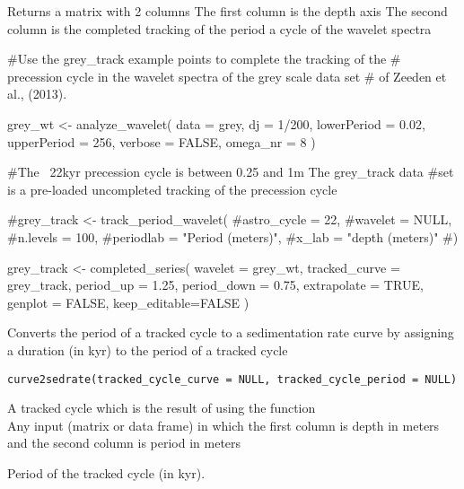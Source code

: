 \documentclass[a4paper]{book}
\begin{document}
%
\begin{Value}
Returns a matrix with 2 columns
The first column is the depth axis
The second column is the completed tracking of the period a cycle of the wavelet spectra
\end{Value}
%
\begin{Examples}
\begin{ExampleCode}

#Use the grey_track example points to complete the tracking of the
# precession cycle in the wavelet spectra of the grey scale data set
# of Zeeden et al., (2013).



grey_wt <-
 analyze_wavelet(
   data = grey,
   dj = 1/200,
   lowerPeriod = 0.02,
   upperPeriod = 256,
   verbose = FALSE,
   omega_nr = 8
 )

#The ~22kyr precession cycle is between 0.25 and 1m The grey_track data
#set is a pre-loaded uncompleted tracking of the precession cycle

#grey_track <- track_period_wavelet(
#astro_cycle = 22,
#wavelet = NULL,
#n.levels = 100,
#periodlab = "Period (meters)",
#x_lab = "depth (meters)"
#)



grey_track <- completed_series(
 wavelet = grey_wt,
 tracked_curve  = grey_track,
 period_up  = 1.25,
 period_down  = 0.75,
 extrapolate = TRUE,
genplot = FALSE,
keep_editable=FALSE
)


\end{ExampleCode}
\end{Examples}
%
\begin{Description}
Converts the period of a tracked cycle to a sedimentation rate curve by
assigning a duration (in kyr) to the period of a tracked cycle
\end{Description}
%
\begin{Usage}
\begin{verbatim}
curve2sedrate(tracked_cycle_curve = NULL, tracked_cycle_period = NULL)
\end{verbatim}
\end{Usage}
%
\begin{Arguments}
\begin{ldescription}
\item[\code{tracked\_cycle\_curve}] A tracked cycle  which is the result of using the  function \\{}
Any input (matrix or data frame) in which the first column is depth in meters and the second column is period in meters

\item[\code{tracked\_cycle\_period}] Period of the tracked cycle (in kyr).
\end{ldescription}
\end{Arguments}
\end{document}
